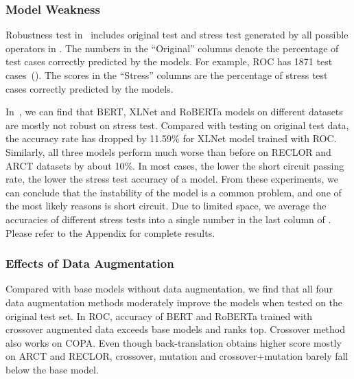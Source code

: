 \subsubsection{Model Weakness}
Robustness test in~ includes original test and stress 
test generated by all possible operators in . 
The numbers in the ``Original'' columns denote the percentage of 
test cases correctly predicted by the models. 
For example, ROC has 1871 test cases~().
The scores in the ``Stress'' columns are the percentage of
stress test cases correctly predicted by the models.

In~, we can find that BERT, XLNet and RoBERTa models on different 
datasets are mostly not robust on stress test.
Compared with testing on original test data, 
the accuracy rate has dropped by 11.59\% for XLNet model trained with ROC. 
Similarly, all three models perform much 
worse than before on RECLOR and ARCT datasets by about 10\%. 
In most cases, the lower the short circuit passing rate, 
the lower the stress test accuracy of a model.
From these experiments, we can conclude that the instability of the model is a common problem, 
and one of the most likely reasons is short circuit. 
Due to limited space, we average the accuracies of different stress tests into a single number 
in the last column of . Please refer to the Appendix for complete results.


\subsubsection{Effects of Data Augmentation}
Compared with 
base models without data augmentation, we find that 
all four data augmentation methods moderately improve
the models when tested on the original test set. 
In ROC, accuracy of BERT and RoBERTa trained with crossover augmented data 
exceeds base models and ranks top. Crossover method also works on COPA. 
Even though back-translation obtains higher score mostly on ARCT and RECLOR,
crossover, mutation and crossover+mutation barely fall below the base model. 

